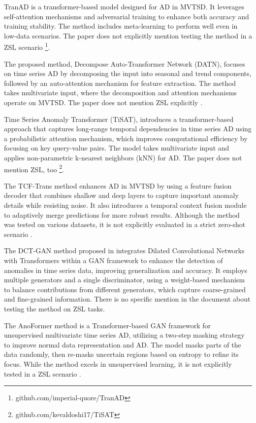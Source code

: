 TranAD is a transformer-based model designed for AD in MVTSD. It leverages self-attention mechanisms and adversarial training to enhance both accuracy and training stability. The method includes meta-learning to perform well even in low-data scenarios. The paper does not explicitly mention testing the method in a ZSL scenario \cite{tuli_tranad_2022} \footnote{\fussy\tiny github.com/imperial-quore/TranAD}.

The proposed method, Decompose Auto-Transformer Network (DATN), focuses on time series AD by decomposing the input into seasonal and trend components, followed by an auto-attention mechanism for feature extraction. The method takes multivariate input, where the decomposition and attention mechanisms operate on MVTSD. The paper does not mention ZSL explicitly \cite{wu_decompose_2023}.

Time Series Anomaly Transformer (TiSAT), introduces a transformer-based approach that captures long-range temporal dependencies in time series AD using a probabilistic attention mechanism, which improves computational efficiency by focusing on key query-value pairs. The model takes multivariate input and applies non-parametric k-nearest neighbors (kNN) for AD. The paper does not mention ZSL, too \cite{doshi_tisat_2022} \footnote{\fussy\tiny github.com/kevaldoshi17/TiSAT}.

The TCF-Trans method enhances AD in MVTSD by using a feature fusion decoder that combines shallow and deep layers to capture important anomaly details while resisting noise. It also introduces a temporal context fusion module to adaptively merge predictions for more robust results. Although the method was tested on various datasets, it is not explicitly evaluated in a strict zero-shot scenario \cite{peng_tcf-trans_2023}.

The DCT-GAN method proposed in \cite{li_dct-gan_2023} integrates Dilated Convolutional Networks with Transformers within a GAN framework to enhance the detection of anomalies in time series data, improving generalization and accuracy. It employs multiple generators and a single discriminator, using a weight-based mechanism to balance contributions from different generators, which capture coarse-grained and fine-grained information. There is no specific mention in the document about testing the method on ZSL tasks.


The AnoFormer method is a Transformer-based GAN framework for unsupervised multivariate time series AD, utilizing a two-step masking strategy to improve normal data representation and AD. The model masks parts of the data randomly, then re-masks uncertain regions based on entropy to refine its focus. While the method excels in unsupervised learning, it is not explicitly tested in a ZSL scenario \cite{shin_time_2023}.

